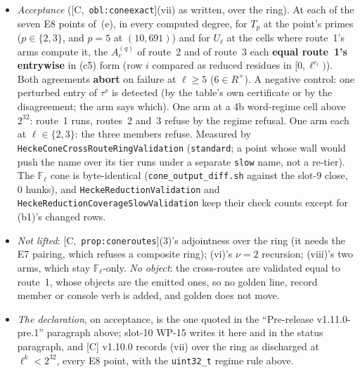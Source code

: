 \documentclass[11pt]{article}
\theoremstyle{remark}
\newcommand{\F}{\mathbb{F}}
\newcommand{\Fl}{\F_\ell}
\newcommand{\HA}[1]{[C,~\texttt{#1}]}      %
\begin{document}
\begin{itemize}
\begin{itemize}
    ring (equal invariant factors, and every basis element of $H^q_c$ exhibited as an image by
    \texttt{solve\_multi\_rhs\_module} modulo the target's relations), and the transported action
    $M\,A'\,M^{-1}$ is computed \textbf{column by column} --- for each $b_j$ of $H^q_c$ a preimage under
    $M$ by the solve, then $A'$, then $M$, reduced in (c5) form. No inverse matrix is formed: a (c5)
    matrix between non-free modules has none in general.
  \item \emph{Acceptance} (\HA{obl:coneexact}(vii) as written, over the ring). At each of the seven
    E8 points of~(e), in every computed degree, for $T_p$ at the point's primes ($p\in\{2,3\}$, and
    $p=5$ at $(10,691)$) and for $U_\ell$ at the cells where route~1's arms compute it, the
    $A^{(q)}_c$ of route~2 and of route~3 each \textbf{equal route~1's entrywise} in (c5) form (row
    $i$ compared as reduced residues in $[0,\ell^{e_i})$). Both agreements \textbf{abort} on failure
    at $\ell\ge5$ ($6\in R^{\times}$). A negative control: one perturbed entry of $\tau^{s}$ is
    detected (by the table's own certificate or by the disagreement; the arm says which). One arm at
    a 4b word-regime cell above $2^{32}$: route~1 runs, routes~2 and~3 refuse by the regime refusal.
    One arm each at $\ell\in\{2,3\}$: the three members refuse. Measured by
    \texttt{HeckeConeCrossRouteRingValidation} (\texttt{standard}; a point whose wall would push the
    name over its tier runs under a separate \texttt{slow} name, not a re-tier). The $\Fl$ cone is
    byte-identical (\texttt{cone\_output\_diff.sh} against the slot-9 close, $0$ hunks), and
    \texttt{HeckeReductionValidation} and \texttt{HeckeReductionCoverageSlowValidation} keep their
    check counts except for (b1)'s changed rows.
  \item \emph{Not lifted}: \HA{prop:coneroutes}(3)'s adjointness over the ring (it needs the E7
    pairing, which refuses a composite ring); (vi)'s $\nu=2$ recursion; (viii)'s two arms, which stay
    $\Fl$-only. \emph{No object}: the cross-routes are validated equal to route~1, whose objects are
    the emitted ones, so no golden line, record member or console verb is added, and golden does not
    move.
  \item \emph{The declaration}, on acceptance, is the one quoted in the ``Pre-release
    v1.11.0-pre.1'' paragraph above; slot-10 WP-15 writes it here and in the status paragraph, and
    [C] v1.10.0 records (vii) over the ring as discharged at $\ell^k<2^{32}$, every E8 point, with the
    \texttt{uint32\_t} regime rule above.

\end{itemize}
\end{itemize}
\end{document}
